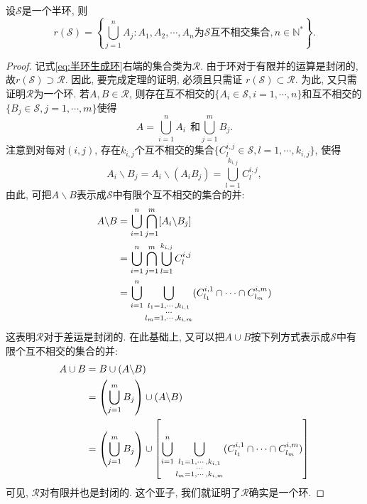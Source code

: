 \begin{theorem}\label{thm:半代数生成代数}
	设$\mathscr{S}$是一个半环, 则
	\begin{equation}\label{eq:半环生成环}
	r(\mathscr{S}) = \left\{ \bigcup_{j=1}^nA_j: A_1,A_2,\cdots,A_n\text{为}\mathscr{S}\text{互不相交集合}, n\in\mathbb{N}^*  \right\}.
	\end{equation}
\end{theorem}

\begin{proof}
	记式\ref{eq:半环生成环}右端的集合类为$\mathscr{R}$. 由于环对于有限并的运算是封闭的, 故$r(\mathscr{S})\supset \mathscr{R}$. 因此, 要完成定理的证明, 必须且只需证 $r(\mathscr{S})\subset \mathscr{R}$. 为此, 又只需证明$\mathscr{R}$为一个环. 若$A,B\in\mathscr{R}$, 则存在互不相交的$\{A_i\in\mathscr{S},i=1,\cdots,n  \}$和互不相交的$\{B_j\in\mathscr{S},j=1,\cdots,m \}$使得
	\begin{equation}
		A = \bigcup_{i=1}^{n}A_i~~\text{和}\bigcup_{j=1}^{m}B_j.
	\end{equation}
	注意到对每对$(i,j)$, 存在$k_{i,j}$个互不相交的集合$\{C_l^{i,j}\in\mathscr{S},l=1,\cdots,k_{i,j}\}$, 使得
	\begin{equation}
		A_i\backslash B_j = A_i\backslash(A_iB_j) = \bigcup_{l=1}^{k_{i,j}}C_l^{i,j},
	\end{equation}
	由此, 可把$A\backslash B$表示成$\mathscr{S}$中有限个互不相交的集合的并:
	\begin{align}
		A\backslash B &= \bigcup_{i=1}^n\bigcap_{j=1}^m [A_i\backslash B_j]\nonumber\\
		&= \bigcup_{i=1}^n\bigcap_{j=1}^m \bigcup_{l=1}^{k_{i,j}}C_l^{i,j}\nonumber\\
		&= \bigcup_{i=1}^n\bigcup_{
			\begin{subarray}{c}
			l_1 = 1,\cdots,k_{i,1}\\
			\cdots\\
			l_m = 1,\cdots,k_{i,m}
			\end{subarray}
		}(C_{l_1}^{i,1}\cap\cdots\cap C_{l_m}^{i,m})
	\end{align}
	这表明$\mathscr{R}$对于差运是封闭的. 在此基础上, 又可以把$A\cup B$按下列方式表示成$\mathscr{S}$中有限个互不相交的集合的并:
	\begin{align}
		A\cup B &= B\cup (A\backslash B)\nonumber\\
		&= \left(\bigcup_{j=1}^m B_j\right)\cup (A\backslash B)\nonumber\\
		&=\left(\bigcup_{j=1}^m B_j\right)\cup\left[ \bigcup_{i=1}^n\bigcup_{
			\begin{subarray}{c}
			l_1 = 1,\cdots,k_{i,1}\\
			\cdots\\
			l_m = 1,\cdots,k_{i,m}
			\end{subarray}
		}(C_{l_1}^{i,1}\cap\cdots\cap C_{l_m}^{i,m}) \right]
	\end{align}
	可见, $\mathscr{R}$对有限并也是封闭的. 这个亚子, 我们就证明了$\mathscr{R}$确实是一个环.
\end{proof}

